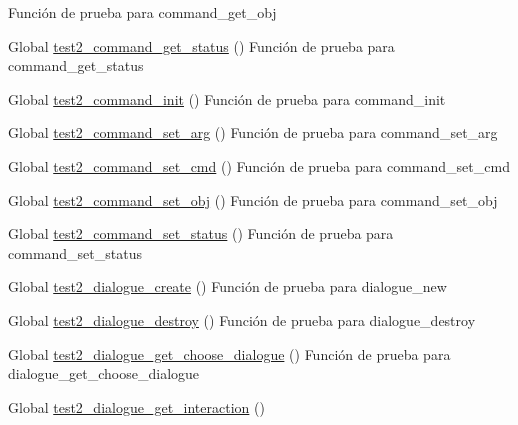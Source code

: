 \begin{DoxyRefList}
%
Función de prueba para command\+\_\+get\+\_\+obj  
\item[Global \mbox{\hyperlink{command__test_8c_a8503e20ea2e558e5df167723d01554b2}{test2\+\_\+command\+\_\+get\+\_\+status}} ()]\label{test__test000009}%
%
Función de prueba para command\+\_\+get\+\_\+status  
\item[Global \mbox{\hyperlink{command__test_8c_a084363877b09c47c4167fb675ba0a6c5}{test2\+\_\+command\+\_\+init}} ()]\label{test__test000002}%
%
Función de prueba para command\+\_\+init  
\item[Global \mbox{\hyperlink{command__test_8c_a77b19292408ea303782a088914c157f9}{test2\+\_\+command\+\_\+set\+\_\+arg}} ()]\label{test__test000017}%
%
Función de prueba para command\+\_\+set\+\_\+arg  
\item[Global \mbox{\hyperlink{command__test_8c_a6d31d85e0bae80d4b3948a15a5b2b00d}{test2\+\_\+command\+\_\+set\+\_\+cmd}} ()]\label{test__test000011}%
%
Función de prueba para command\+\_\+set\+\_\+cmd  
\item[Global \mbox{\hyperlink{command__test_8c_a1d4cc678d18ff7dc5b6db5efe591dd76}{test2\+\_\+command\+\_\+set\+\_\+obj}} ()]\label{test__test000022}%
%
Función de prueba para command\+\_\+set\+\_\+obj  
\item[Global \mbox{\hyperlink{command__test_8c_a67ea36686a450269ef95eace71e78867}{test2\+\_\+command\+\_\+set\+\_\+status}} ()]\label{test__test000007}%
%
Función de prueba para command\+\_\+set\+\_\+status  
\item[Global \mbox{\hyperlink{dialogue__test_8c_ae8d40aea4149ebac0405882532e55cb0}{test2\+\_\+dialogue\+\_\+create}} ()]\label{test__test000028}%
%
Función de prueba para dialogue\+\_\+new  
\item[Global \mbox{\hyperlink{dialogue__test_8c_a99a74f2dbef5bee1740334e527f9503a}{test2\+\_\+dialogue\+\_\+destroy}} ()]\label{test__test000030}%
%
Función de prueba para dialogue\+\_\+destroy  
\item[Global \mbox{\hyperlink{dialogue__test_8c_a8801cfd4b53552dbc2f9b15ee9127d91}{test2\+\_\+dialogue\+\_\+get\+\_\+choose\+\_\+dialogue}} ()]\label{test__test000045}%
%
Función de prueba para dialogue\+\_\+get\+\_\+choose\+\_\+dialogue  
\item[Global \mbox{\hyperlink{dialogue__test_8c_a23c69f07c0075b5353ab0be68466f54b}{test2\+\_\+dialogue\+\_\+get\+\_\+interaction}} ()]\label{test__test000050}%

\end{DoxyRefList}
